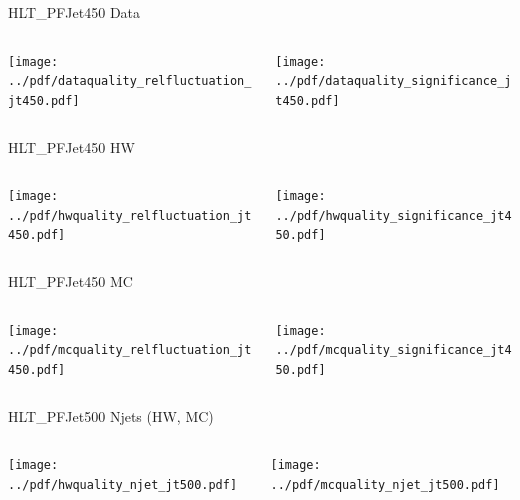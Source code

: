 \documentclass[9pt]{beamer}
\begin{document}
\begin{frame}[t]{HLT\_PFJet450 Data}
\begin{columns}[T]
  \begin{column}{.5\textwidth}
  \texttt{[image: ../pdf/dataquality\_relfluctuation\_jt450.pdf]}
  \end{column}
  \begin{column}{.5\textwidth}
  \texttt{[image: ../pdf/dataquality\_significance\_jt450.pdf]}
  \end{column}
\end{columns}
\end{frame}

\begin{frame}[t]{HLT\_PFJet450 HW}
\begin{columns}[T]
  \begin{column}{.5\textwidth}
  \texttt{[image: ../pdf/hwquality\_relfluctuation\_jt450.pdf]}
  \end{column}
  \begin{column}{.5\textwidth}
  \texttt{[image: ../pdf/hwquality\_significance\_jt450.pdf]}
  \end{column}
\end{columns}
\end{frame}

\begin{frame}[t]{HLT\_PFJet450 MC}
\begin{columns}[T]
  \begin{column}{.5\textwidth}
  \texttt{[image: ../pdf/mcquality\_relfluctuation\_jt450.pdf]}
  \end{column}
  \begin{column}{.5\textwidth}
  \texttt{[image: ../pdf/mcquality\_significance\_jt450.pdf]}
  \end{column}
\end{columns}
\end{frame}

\begin{frame}[t]{HLT\_PFJet500 Njets (HW, MC)}
\begin{columns}[T]
  \begin{column}{.5\textwidth}
  \texttt{[image: ../pdf/hwquality\_njet\_jt500.pdf]}
  \end{column}
  \begin{column}{.5\textwidth}
  \texttt{[image: ../pdf/mcquality\_njet\_jt500.pdf]}
  \end{column}
\end{columns}
\end{frame}
\end{document}
